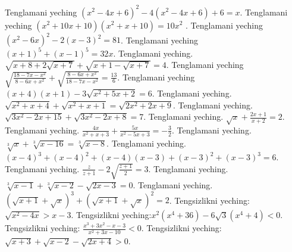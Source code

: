 Tenglamani yeching \(\left( x^{2} - 4x + 6 \right)^{2} - 4\left( x^{2} - 4x + 6 \right) + 6 = x\).
Tenglamani yeching \(\left( x^{2} + 10x + 10 \right)\left( x^{2} + x + 10 \right) = 10x^{2}\) .
Tenglamani yeching \(\left( x^{2} - 6x \right)^{2} - 2(x - 3)^{2} = 81\).
Tenglamani yeching \((x + 1)^{5} + (x - 1)^{5} = 32x\).
Tenglamani yeching. \(\sqrt{x + 8 + 2\sqrt{x + 7}} + \sqrt{x + 1 - \sqrt{x + 7}} = 4\).
Tenglamani yeching \(\sqrt{\frac{18 - 7x - x^{2}}{8 - 6x + x^{2}}} + \sqrt{\frac{8 - 6x + x^{2}}{18 - 7x - x^{2}}} = \frac{13}{6}\).
Tenglamani yeching \((x + 4)(x + 1) - 3\sqrt{x^{2} + 5x + 2} = 6\).
Tenglamani yeching. \(\sqrt{x^{2} + x + 4} + \sqrt{x^{2} + x + 1} = \sqrt{2x^{2} + 2x + 9}\).
Tenglamani yeching. \(\sqrt{3x^{2} - 2x + 15} + \sqrt{3x^{2} - 2x + 8} = 7\).
Tenglamani yeching. \(\sqrt{x} + \frac{2x + 1}{x + 2} = 2\).
Tenglamani yeching. \(\frac{4x}{x^{2} + x + 3} + \frac{5x}{x^{2} - 5x + 3} = - \frac{3}{2}\).
Tenglamani yeching. \(\sqrt[3]{x} + \sqrt[3]{x - 16} = \sqrt[3]{x - 8}\).
Tenglamani yeching. \((x - 4)^{3} + (x - 4)^{2} + (x - 4)(x - 3) + (x - 3)^{2} + (x - 3)^{3} = 6\).
Tenglamani yeching. \(\frac{z}{z + 1} - 2\sqrt{\frac{z + 1}{2}} = 3\).
Tenglamani yeching. \(\sqrt[3]{x - 1} + \sqrt[3]{x - 2} - \sqrt{2x - 3} = 0\).
Tenglamani yeching. \((\sqrt{x + 1} + \sqrt{x})^{3} + (\sqrt{x + 1} + \sqrt{x})^{2} = 2\).
Tengsizlikni yeching: \(\sqrt{x^{2} - 4x} > x - 3\).
Tengsizlikni yeching:\(x^{2}\left( x^{4} + 36 \right) - 6\sqrt{3}\left( x^{4} + 4 \right) < 0\).
Tengsizlikni yeching: \(\frac{x^{3} + 3x^{2} - x - 3}{x^{2} + 3x - 10} < 0\).
Tengsizlikni yeching: \(\sqrt{x + 3} + \sqrt{x - 2} - \sqrt{2x + 4} > 0\).